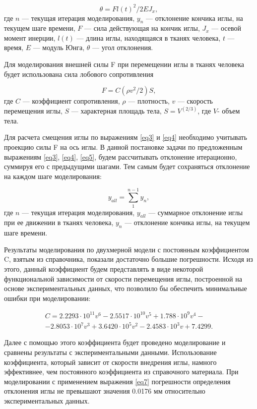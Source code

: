 \documentclass[twoside]{article}
\begin{document}
\begin{equation} \label{eq4}
\theta = Fl(t)^2 / 2EJ_{x},
\end{equation}
где $n$ --- текущая итерация моделирования, $y_{n}$ --- отклонение кончика иглы, на текущем шаге времени,
$F$ --- сила действующая на кончик иглы, $J_{x}$ --- осевой момент инерции, 
$l(t)$ --- длина иглы, находящаяся в тканях человека, $t$ --- время, $E$ --- модуль Юнга, $\theta$ --- угол отклонения.

Для моделирования внешней силы F при перемещении иглы в тканях человека будет использована сила лобового сопротивления

\begin{equation} \label{eq5}
F = C (\rho v^2/2) S, 
\end{equation}
где $C$ --- коэффициент сопротивления, $\rho$ --- плотность, $v$ --- скорость перемещения иглы, $S$ --- характерная площадь тела, $S = V^{(2/3)}$, где $V$- объем тела.

Для расчета смещения иглы по выражениям \eqref{eq3} и \eqref{eq4} необходимо учитывать проекцию силы F на ось иглы.
В данной постановке задачи по предложенным выражениям \eqref{eq3}, \eqref{eq4}, \eqref{eq5}, будем рассчитывать отклонение итерационно, суммируя его с предыдущими шагами. Тем самым будет сохраняться отклонение на каждом шаге моделирования:

\begin{equation} \label{eq6}
y_{all} = \sum\limits_{1}^{n-1} y_{n},
\end{equation}
где $n$ --- текущая итерация моделирования, $y_{all}$ --- суммарное отклонение иглы при ее движении в тканях человека, $y_{n}$ --- отклонение кончика иглы, на текущем шаге времени.

Результаты моделирования по двухмерной модели с постоянным коэффициентом C, взятым из справочника, показали достаточно большие погрешности. Исходя из этого, данный коэффициент будем представлять в виде некоторой функциональной зависимости от скорости перемещения иглы, построенной на основе экспериментальных данных, что позволило бы обеспечить минимальные ошибки при моделировании: 

\begin{multline} \label{eq7}
C= 2.2293\cdot10^{11} v^6 - 2.5517\cdot10^{10} v^5+1.788\cdot10^9 v^4 - \\ -2.8053\cdot10^7 v^3 +3.6420\cdot10^5 v^2-2.4583\cdot10^3 v+7.4299.
\end{multline}

Далее с помощью этого коэффициента будет проведено моделирование и сравнены результаты с экспериментальными данными.
Использование коэффициента, который зависит от скорости внедрения иглы, намного эффективнее, чем постоянного коэффициента из справочного материала. При моделировании с применением выражения \eqref{eq7} погрешности определения отклонения иглы не превышают значения 0.0176 мм относительно экспериментальных данных.

\bigskip
\begin{thebibliography}{99}
\small


\end{thebibliography}
\end{document}
